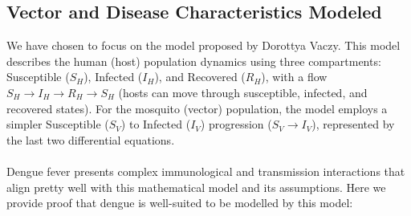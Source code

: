\subsection{Vector and Disease Characteristics Modeled}
We have chosen to focus on the model proposed by Dorottya Vaczy. This model describes the human (host) population dynamics using three compartments: Susceptible ($S_H$), Infected ($I_H$), and Recovered ($R_H$), with a flow $S_H \rightarrow I_H \rightarrow R_H \rightarrow S_H$ (hosts can move through susceptible, infected, and recovered states). For the mosquito (vector) population, the model employs a simpler Susceptible ($S_V$) to Infected ($I_V$) progression ($S_V \rightarrow I_V$), represented by the last two differential equations.
\\\\
Dengue fever presents complex immunological and transmission interactions that align pretty well with this mathematical model and its assumptions. Here we provide proof that dengue is well-suited to be modelled by this model:

